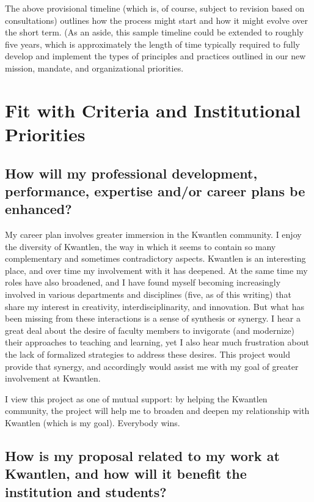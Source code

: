 \documentclass[10pt, letterpaper]{article}
\begin{document}
The above provisional timeline (which is, of course, subject to revision based on consultations) outlines how the process might start and how it might evolve over the short term. (As an aside, this sample timeline could be extended to roughly five years, which is approximately the length of time typically required to fully develop and implement the types of principles and practices outlined in our new mission, mandate, and organizational priorities.

\section*{Fit with Criteria and Institutional Priorities}

\subsection*{How will my professional development, performance, expertise and/or career plans be enhanced?}

My career plan involves greater immersion in the Kwantlen community. I enjoy the diversity of Kwantlen, the way in which it seems to contain so many complementary and sometimes contradictory aspects. Kwantlen is an interesting place, and over time my involvement with it has deepened. At the same time  my roles have also broadened, and I have found myself becoming increasingly involved in various departments and disciplines (five, as of this writing) that share my interest in creativity, interdisciplinarity, and innovation. But what has been missing from these interactions is a sense of synthesis or synergy. I hear a great deal about the desire of faculty members to invigorate (and modernize) their approaches to teaching and learning, yet I also hear much frustration about the lack of formalized strategies to address these desires. This project would provide that synergy, and accordingly would assist me with my goal of greater involvement at Kwantlen.

I view this project as one of mutual support: by helping the Kwantlen community, the project will help me to broaden and deepen my relationship with Kwantlen (which is my goal). Everybody wins.

\subsection*{How is my proposal related to my work at Kwantlen, and how will it benefit the institution and students?}
\end{document}
